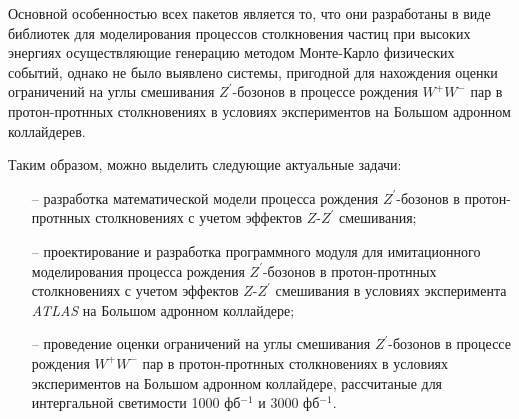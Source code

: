 Основной особенностью всех пакетов является то, что они разработаны в виде библиотек для моделирования процессов столкновения частиц при высоких энергиях осуществляющие генерацию методом Монте-Карло физических событий, однако не было выявлено системы, пригодной для нахождения оценки ограничений на углы смешивания ${Z}^{\prime}$-бозонов в процессе рождения ${W}^{+}$${W}^{-}$ пар в протон-протнных столкновениях в условиях экспериментов на Большом адронном коллайдерев.

Таким образом, можно выделить следующие актуальные задачи:
\begin{enumerate}
	\item[--] разработка математической модели процесса рождения ${Z}^{\prime}$-бозонов в протон-протнных столкновениях с учетом эффектов $Z$-${Z}^{\prime}$ смешивания;
	
	\item[--] проектирование и разработка программного модуля для имитационного моделирования процесса
	рождения ${Z}^{\prime}$-бозонов в протон-протнных столкновениях с учетом эффектов $Z$-${Z}^{\prime}$ смешивания в условиях эксперимента \textit{ATLAS} на Большом адронном коллайдере;
	
	\item[--] проведение оценки ограничений на углы смешивания ${Z}^{\prime}$-бозонов в процессе рождения ${W}^{+}$${W}^{-}$ пар в протон-протнных столкновениях
	в условиях экспериментов на Большом адронном коллайдере, рассчитаные для интергальной светимости 1000 фб${}^{−1}$ и 3000 фб${}^{−1}$.
	
\end{enumerate}